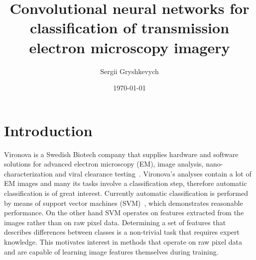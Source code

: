 \documentclass[a4paper, 11pt, table]{article}
\title{Convolutional neural networks for classification of transmission electron microscopy imagery}
\author{Sergii Gryshkevych}
\date{\today}
\begin{document}


\newpage\phantom{}

\newpage\phantom{}
\newpage\phantom{}


\tableofcontents

\section{Introduction}
Vironova is a Swedish Biotech company that supplies hardware and software solutions for advanced electron microscopy (EM), image analysis, nano-characterization and viral clearance testing~\cite{virnonva_linkedin}. Vironova's analyses contain a lot of EM images and many its tasks involve a classification step, therefore automatic classification is of great interest. Currently automatic classification is performed by means of support vector machines (SVM)~\cite{Boser:1992:TAO:130385.130401}, which demonstrates reasonable performance. On the other hand SVM operates on features extracted from the images rather than on raw pixel data. Determining a set of features that describes differences between classes is a non-trivial task that requires expert knowledge. This motivates interest in methods that operate on raw pixel data and are capable of learning image features themselves during training. 
\end{document}
